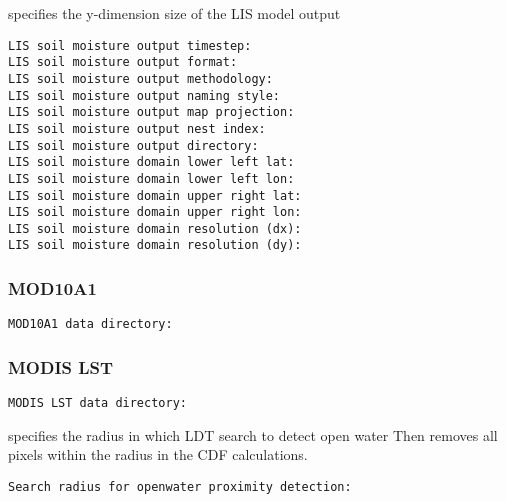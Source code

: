  specifies the y-dimension size of the LIS model output
 

 \begin{Verbatim}[frame=single]
LIS soil moisture output timestep:
LIS soil moisture output format:
LIS soil moisture output methodology:
LIS soil moisture output naming style:
LIS soil moisture output map projection:
LIS soil moisture output nest index:
LIS soil moisture output directory:
LIS soil moisture domain lower left lat:
LIS soil moisture domain lower left lon:
LIS soil moisture domain upper right lat:
LIS soil moisture domain upper right lon:
LIS soil moisture domain resolution (dx):
LIS soil moisture domain resolution (dy):
 \end{Verbatim}

 
 \subsubsection{MOD10A1} 

  

 

 \begin{Verbatim}[frame=single]
MOD10A1 data directory:
 \end{Verbatim}

 
 \subsubsection{MODIS LST} 

  

 

 \begin{Verbatim}[frame=single]
MODIS LST data directory:
 \end{Verbatim}


 
 specifies the radius in which LDT search to detect open water
 Then removes all pixels within the radius in the CDF calculations. 
 
 \begin{Verbatim}[frame=single]
Search radius for openwater proximity detection: 
 \end{Verbatim}



